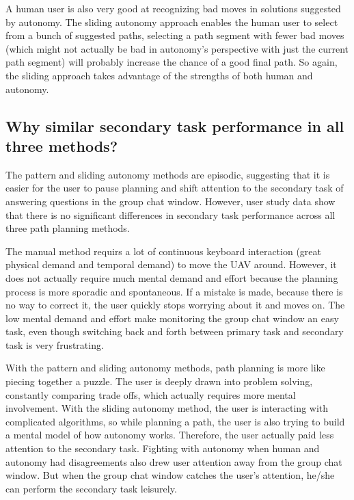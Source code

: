 \documentclass[lettersize, apacite, twoside, HRI]{apa_HRI}
\begin{document}
A human user is also very good at recognizing bad moves in solutions suggested by autonomy. The sliding autonomy approach enables the human user to select from a bunch of suggested paths, selecting a path segment with fewer bad moves (which might not actually be bad in autonomy's perspective with just the current path segment) will probably increase the chance of a good final path. So again, the sliding approach takes advantage of the strengths of both human and autonomy.

\subsection{Why similar secondary task performance in all three methods?}

The pattern and sliding autonomy methods are episodic, suggesting that it is easier for the user to pause planning and shift attention to the secondary task of answering questions in the group chat window. However, user study data show that there is no significant differences in secondary task performance across all three path planning methods.

The manual method requirs a lot of continuous keyboard interaction (great physical demand and temporal demand) to move the UAV around. However, it does not actually require much mental demand and effort because the planning process is more sporadic and spontaneous. If a mistake is made, because there is no way to correct it, the user quickly stops worrying about it and moves on. The low mental demand and effort make monitoring the group chat window an easy task, even though switching back and forth between primary task and secondary task is very frustrating.

With the pattern and sliding autonomy methods, path planning is more like piecing together a puzzle. The user is deeply drawn into problem solving, constantly comparing trade offs, which actually requires more mental involvement. With the sliding autonomy method, the user is interacting with complicated algorithms, so while planning a path, the user is also trying to build a mental model of how autonomy works. Therefore, the user actually paid less attention to the secondary task. Fighting with autonomy when human and autonomy had disagreements also drew user attention away from the group chat window. But when the group chat window catches the user's attention, he/she can perform the secondary task leisurely.
\end{document}
